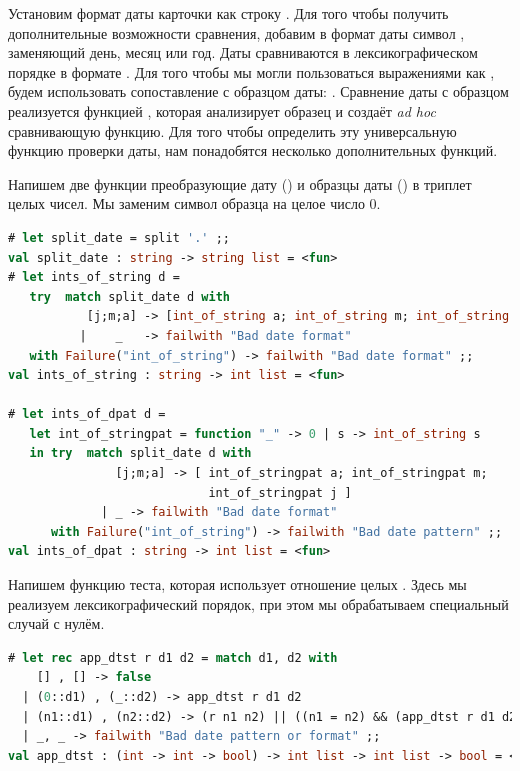 Установим формат даты карточки как строку . Для того чтобы 
получить дополнительные возможности сравнения, добавим в формат даты символ 
, заменяющий день, месяц или год. Даты сравниваются в 
лексикографическом порядке в формате . Для того чтобы 
мы могли пользоваться выражениями как , будем использовать 
сопоставление с образцом даты: . Сравнение даты с образцом 
реализуется функцией , которая анализирует образец и создаёт 
{\it ad hoc} сравнивающую функцию. Для того чтобы определить эту универсальную 
функцию проверки даты, нам понадобятся несколько дополнительных функций.

Напишем две функции преобразующие дату () и образцы даты 
() в триплет целых чисел. Мы заменим символ  
образца на целое число 0.

\begin{lstlisting}[language=OCaml]
# let split_date = split '.' ;;
val split_date : string -> string list = <fun>
# let ints_of_string d =
   try  match split_date d with
           [j;m;a] -> [int_of_string a; int_of_string m; int_of_string j]
          |    _   -> failwith "Bad date format"
   with Failure("int_of_string") -> failwith "Bad date format" ;;
val ints_of_string : string -> int list = <fun>

# let ints_of_dpat d =
   let int_of_stringpat = function "_" -> 0 | s -> int_of_string s
   in try  match split_date d with
               [j;m;a] -> [ int_of_stringpat a; int_of_stringpat m; 
                            int_of_stringpat j ]
             | _ -> failwith "Bad date format"
      with Failure("int_of_string") -> failwith "Bad date pattern" ;;
val ints_of_dpat : string -> int list = <fun>
\end{lstlisting}

Напишем функцию теста, которая использует отношение целых . Здесь мы 
реализуем лексикографический порядок, при этом мы обрабатываем специальный 
случай с нулём.

\begin{lstlisting}[language=OCaml]
# let rec app_dtst r d1 d2 = match d1, d2 with
    [] , [] -> false
  | (0::d1) , (_::d2) -> app_dtst r d1 d2
  | (n1::d1) , (n2::d2) -> (r n1 n2) || ((n1 = n2) && (app_dtst r d1 d2))
  | _, _ -> failwith "Bad date pattern or format" ;;
val app_dtst : (int -> int -> bool) -> int list -> int list -> bool = <fun>
\end{lstlisting}


